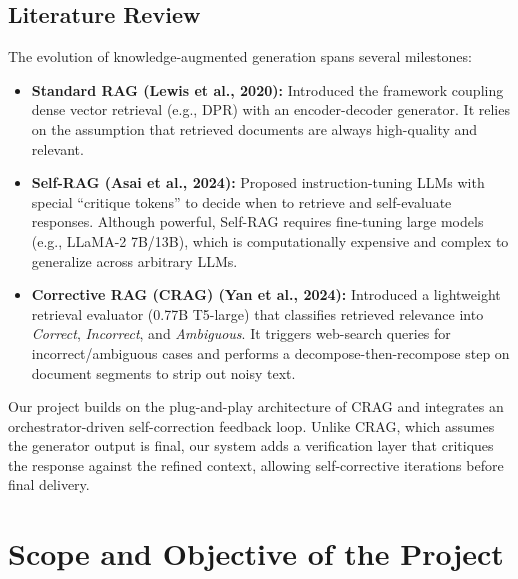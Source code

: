 \documentclass[12pt,a4paper]{article}
\begin{document}
\subsection{Literature Review}
The evolution of knowledge-augmented generation spans several milestones:
\begin{itemize}
    \item \textbf{Standard RAG (Lewis et al., 2020):} Introduced the framework coupling dense vector retrieval (e.g., DPR) with an encoder-decoder generator. It relies on the assumption that retrieved documents are always high-quality and relevant.
    \item \textbf{Self-RAG (Asai et al., 2024):} Proposed instruction-tuning LLMs with special ``critique tokens'' to decide when to retrieve and self-evaluate responses. Although powerful, Self-RAG requires fine-tuning large models (e.g., LLaMA-2 7B/13B), which is computationally expensive and complex to generalize across arbitrary LLMs.
    \item \textbf{Corrective RAG (CRAG) (Yan et al., 2024):} Introduced a lightweight retrieval evaluator (0.77B T5-large) that classifies retrieved relevance into \textit{Correct}, \textit{Incorrect}, and \textit{Ambiguous}. It triggers web-search queries for incorrect/ambiguous cases and performs a decompose-then-recompose step on document segments to strip out noisy text.
\end{itemize}
Our project builds on the plug-and-play architecture of CRAG and integrates an orchestrator-driven self-correction feedback loop. Unlike CRAG, which assumes the generator output is final, our system adds a verification layer that critiques the response against the refined context, allowing self-corrective iterations before final delivery.

\newpage

\section{Scope and Objective of the Project}
\end{document}
